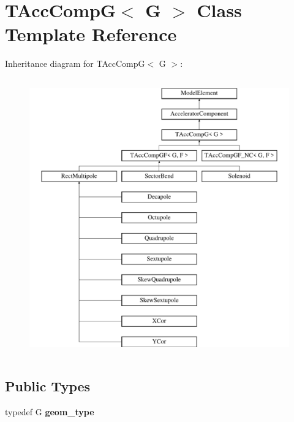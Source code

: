 \hypertarget{classTAccCompG}{}\section{T\+Acc\+CompG$<$ G $>$ Class Template Reference}
\label{classTAccCompG}
Inheritance diagram for T\+Acc\+CompG$<$ G $>$\+:\begin{figure}[H]
\begin{center}
\leavevmode
\includegraphics[height=12.000000cm]{classTAccCompG}
\end{center}
\end{figure}
\subsection*{Public Types}
\begin{DoxyCompactItemize}
\item 
\mbox{\label{classTAccCompG_a19895cb5a930fb13d638a53ea2e292f0}} 
typedef G {\bfseries geom\+\_\+type}
\end{DoxyCompactItemize}
